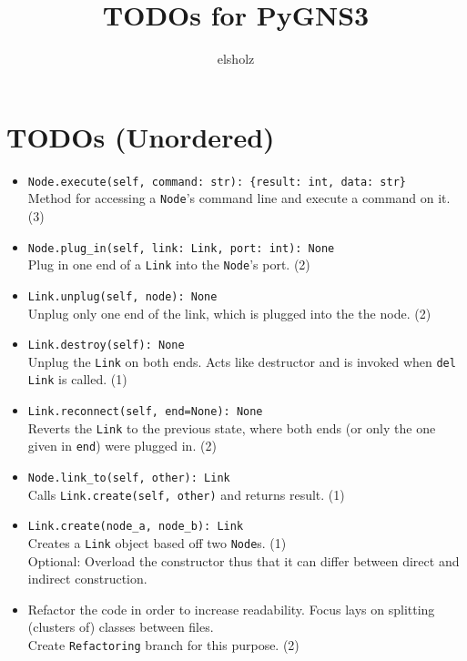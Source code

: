 \documentclass[a4paper,10pt]{article}
\begin{document}
\title{TODOs for PyGNS3}
\author{elsholz}
\maketitle
\def\code#1{\texttt{#1}}

\section{TODOs (Unordered)}
\begin{itemize}
\item  \code{Node.execute(self, command: str): \{result: int, data: str\}} \\
Method for accessing a \code{Node}'s command line and execute a command on it. (3)
\item \code{Node.plug\_in(self, link: Link, port: int): None}\\
Plug in one end of a \code{Link} into the \code{Node}'s port. (2)
\item \code{Link.unplug(self, node): None}\\
Unplug only one end of the link, which is plugged into the the node. (2)
\item \code{Link.destroy(self): None}\\
Unplug the \code{Link} on both ends. Acts like destructor and is invoked when \code{del Link} is called. (1)
\item \code{Link.reconnect(self, end=None): None}\\
Reverts the \code{Link} to the previous state, where both ends (or only the one given in \code{end}) were plugged in.  (2)
\item \code{Node.link\_to(self, other): Link}\\
Calls \code{Link.create(self, other)} and returns result.  (1)
\item \code{Link.create(node\_a, node\_b): Link}\\ 
Creates a \code{Link} object based off two \code{Node}s. (1) \\
Optional: Overload the constructor thus that it can differ between direct and indirect construction.
\item Refactor the code in order to increase readability. Focus lays on splitting (clusters of) classes between files. \\
Create \code{Refactoring} branch for this purpose. (2)

\end{itemize}
\end{document}
